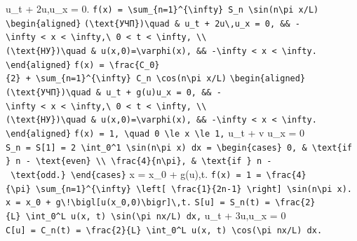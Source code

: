 \documentclass[
  ukrainian,
]{article}
\begin{document}
u\_t + 2u,u\_x = 0.
\texttt{f(x)\ =\ \textbackslash{}sum\_\{n=1\}\^{}\{\textbackslash{}infty\}\ S\_n\ \textbackslash{}sin(n\textbackslash{}pi\ x/L)}
\texttt{\textbackslash{}begin\{aligned\}}
\texttt{(\textbackslash{}text\{УЧП\})\textbackslash{}quad\ \&\ u\_t\ +\ 2u\textbackslash{},u\_x\ =\ 0,\ \&\&\ -\textbackslash{}infty\ \textless{}\ x\ \textless{}\ \textbackslash{}infty,\textbackslash{}\ 0\ \textless{}\ t\ \textless{}\ \textbackslash{}infty,\ \textbackslash{}\textbackslash{}}
\texttt{(\textbackslash{}text\{НУ\})\textbackslash{}quad\ \&\ u(x,0)=\textbackslash{}varphi(x),\ \&\&\ -\textbackslash{}infty\ \textless{}\ x\ \textless{}\ \textbackslash{}infty.}
\texttt{\textbackslash{}end\{aligned\}}
\texttt{f(x)\ =\ \textbackslash{}frac\{C\_0\}\{2\}\ +\ \textbackslash{}sum\_\{n=1\}\^{}\{\textbackslash{}infty\}\ C\_n\ \textbackslash{}cos(n\textbackslash{}pi\ x/L)}
\texttt{\textbackslash{}begin\{aligned\}}
\texttt{(\textbackslash{}text\{УЧП\})\textbackslash{}quad\ \&\ u\_t\ +\ g(u)u\_x\ =\ 0,\ \&\&\ -\textbackslash{}infty\ \textless{}\ x\ \textless{}\ \textbackslash{}infty,\textbackslash{}\ 0\ \textless{}\ t\ \textless{}\ \textbackslash{}infty,\ \textbackslash{}\textbackslash{}}
\texttt{(\textbackslash{}text\{НУ\})\textbackslash{}quad\ \&\ u(x,0)=\textbackslash{}varphi(x),\ \&\&\ -\textbackslash{}infty\ \textless{}\ x\ \textless{}\ \textbackslash{}infty.}
\texttt{\textbackslash{}end\{aligned\}}
\texttt{f(x)\ =\ 1,\ \textbackslash{}quad\ 0\ \textbackslash{}le\ x\ \textbackslash{}le\ 1,}
u\_t + v u\_x = 0
\texttt{S\_n\ =\ S{[}1{]}\ =\ 2\ \textbackslash{}int\_0\^{}1\ \textbackslash{}sin(n\textbackslash{}pi\ x)\ dx\ =\ \textbackslash{}begin\{cases\}\ 0,\ \&\ \textbackslash{}text\{if\ \}\ n\ -\ \textbackslash{}text\{even\}\ \textbackslash{}\textbackslash{}\ \textbackslash{}frac\{4\}\{n\textbackslash{}pi\},\ \&\ \textbackslash{}text\{if\ \}\ n\ -\ \textbackslash{}text\{odd.\}\ \textbackslash{}end\{cases\}}
x = x\_0 + g(u),t.
\texttt{f(x)\ =\ 1\ =\ \textbackslash{}frac\{4\}\{\textbackslash{}pi\}\ \textbackslash{}sum\_\{n=1\}\^{}\{\textbackslash{}infty\}\ \textbackslash{}left{[}\ \textbackslash{}frac\{1\}\{2n-1\}\ \textbackslash{}right{]}\ \textbackslash{}sin(n\textbackslash{}pi\ x).}
\texttt{x\ =\ x\_0\ +\ g\textbackslash{}!\textbackslash{}bigl{[}u(x\_0,0)\textbackslash{}bigr{]}\textbackslash{},t.}
\texttt{S{[}u{]}\ =\ S\_n(t)\ =\ \textbackslash{}frac\{2\}\{L\}\ \textbackslash{}int\_0\^{}L\ u(x,\ t)\ \textbackslash{}sin(\textbackslash{}pi\ nx/L)\ dx,}
u\_t + 3u,u\_x = 0
\texttt{C{[}u{]}\ =\ C\_n(t)\ =\ \textbackslash{}frac\{2\}\{L\}\ \textbackslash{}int\_0\^{}L\ u(x,\ t)\ \textbackslash{}cos(\textbackslash{}pi\ nx/L)\ dx.}
\end{document}

